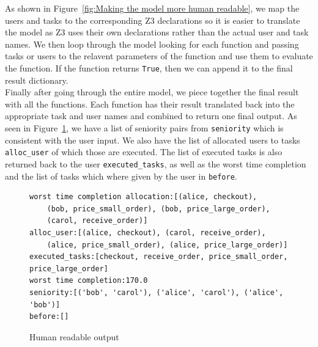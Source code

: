 \documentclass[a4paper]{report}
\begin{document}
As shown in Figure~\ref{fig:Making the model more human readable}, we map the users and tasks to the corresponding Z3 declarations so it is easier to translate the model as Z3 uses their own declarations rather than the actual user and task names. We then loop through the model looking for each function and passing tasks or users to the relavent parameters of the function and use them to evaluate the function. If the function returns \texttt{True}, then we can append it to the final result dictionary. \\

Finally after going through the entire model, we piece together the final result with all the functions. Each function has their result translated back into the appropriate task and user names and combined to return one final output. As seen in Figure~\ref{fig:Human readable output}, we have a list of seniority pairs from \texttt{seniority} which is consistent with the user input. We also have the list of allocated users to tasks \texttt{alloc\_user} of which those are executed. The list of executed tasks is also returned back to the user \texttt{executed\_tasks}, as well as the worst time completion and the list of tasks which where given by the user in \texttt{before}.

\begin{figure}[!h]
\begin{lstlisting}[frame=single]
worst time completion allocation:[(alice, checkout), 
	(bob, price_small_order), (bob, price_large_order), 
	(carol, receive_order)]
alloc_user:[(alice, checkout), (carol, receive_order), 
	(alice, price_small_order), (alice, price_large_order)]
executed_tasks:[checkout, receive_order, price_small_order, price_large_order]
worst time completion:170.0
seniority:[('bob', 'carol'), ('alice', 'carol'), ('alice', 'bob')]
before:[]

\end{lstlisting}
\caption{Human readable output}
\label{fig:Human readable output}
\end{figure}
\end{document}
